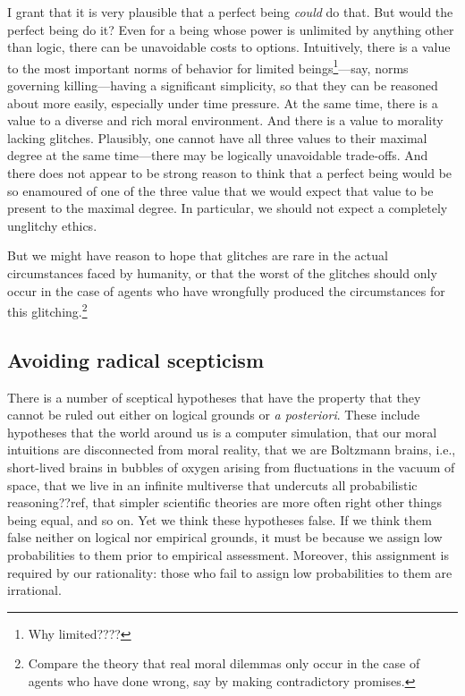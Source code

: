 I grant that it is very plausible that a perfect being \textit{could} do that. But would the perfect being do it? Even for a being
whose power is unlimited by anything other than logic, there can be unavoidable costs to options. Intuitively, there is a value to
the most important norms of behavior for limited beings\footnote{Why limited????}---say, norms governing killing---having a significant simplicity, so that
they can be reasoned about more easily, especially under time pressure.  At the same
time, there is a value to a diverse and rich moral environment. And there is a value to morality lacking glitches. Plausibly,
one cannot have all three values to their maximal degree at the same time---there may be logically unavoidable trade-offs. 
And there does not appear to be strong reason to think that a perfect being would be so enamoured of one of the three value that
we would expect that value to be present to the maximal degree. In particular, we should not expect a completely unglitchy ethics.

But we might have reason to hope that glitches are rare in the actual circumstances faced by humanity, or that the worst of the
glitches should only occur in the case of agents who have wrongfully produced the circumstances for this glitching.\footnote{Compare the theory that real moral
dilemmas only occur in the case of agents who have done wrong, say by making contradictory promises.}


\subsection{Avoiding radical scepticism}
There is a number of sceptical hypotheses that have the property that they cannot be ruled out either on logical grounds
or \textit{a posteriori}. These include hypotheses that the world around us is a computer simulation, that our moral
intuitions are disconnected from moral reality, that we are Boltzmann brains, i.e., short-lived brains in bubbles of 
oxygen arising from fluctuations in the vacuum of space, that we live in an infinite multiverse that undercuts all
probabilistic reasoning??ref, that simpler scientific theories are more often right other things being equal, and so 
on. Yet we think these hypotheses false. If we think them false neither on logical nor empirical grounds, it must be 
because we assign low probabilities to them prior to empirical assessment. Moreover, this assignment is required by 
our rationality: those who fail to assign low probabilities to them are irrational.

